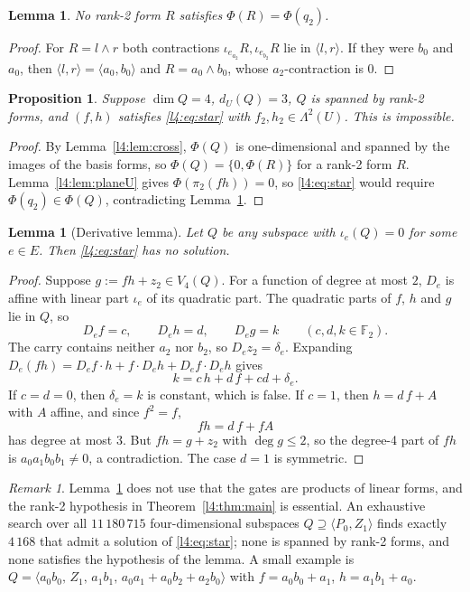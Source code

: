 \documentclass[11pt,a4paper]{article}
\theoremstyle{plain}
\newtheorem{lemma}[theorem]{Lemma}
\newtheorem{proposition}[theorem]{Proposition}
\theoremstyle{remark}
\newtheorem{remark}[theorem]{Remark}
\newcommand{\F}{\mathbb F_2}
\newcommand{\Lam}{\Lambda^2}
\newcommand{\dU}{d_U}
\newcommand{\Dir}{E}
\begin{document}
\begin{lemma}\label{l4:lem:noq2}
No rank-2 form $R$ satisfies $\Phi(R)=\Phi(q_2)$.
\end{lemma}

\begin{proof}
For $R=l\wedge r$ both contractions $\iota_{e_{a_2}}R,\iota_{e_{b_2}}R$ lie in $\langle l,r\rangle$. If they were $b_0$ and $a_0$, then $\langle l,r\rangle=\langle a_0,b_0\rangle$ and $R=a_0\wedge b_0$, whose $a_2$-contraction is $0$.
\end{proof}

\begin{proposition}\label{l4:prop:B}
Suppose $\dim Q=4$, $\dU(Q)=3$, $Q$ is spanned by rank-2 forms, and $(f,h)$ satisfies \eqref{l4:eq:star} with $f_2,h_2\in\Lam(U)$. This is impossible.
\end{proposition}

\begin{proof}
By Lemma~\ref{l4:lem:cross}, $\Phi(Q)$ is one-dimensional and spanned by the images of the basis forms, so $\Phi(Q)=\{0,\Phi(R)\}$ for a rank-2 form $R$. Lemma~\ref{l4:lem:planeU} gives $\Phi(\pi_2(fh))=0$, so \eqref{l4:eq:star} would require $\Phi(q_2)\in\Phi(Q)$, contradicting Lemma~\ref{l4:lem:noq2}.
\end{proof}

\begin{lemma}[Derivative lemma]\label{l4:lem:deriv}
Let $Q$ be any subspace with $\iota_e(Q)=0$ for some $e\in\Dir$. Then \eqref{l4:eq:star} has no solution.
\end{lemma}

\begin{proof}
Suppose $g:=fh+z_2\in V_4(Q)$. For a function of degree at most $2$, $D_e$ is affine with linear part $\iota_e$ of its quadratic part. The quadratic parts of $f$, $h$ and $g$ lie in $Q$, so
\[
  D_ef=c,\qquad D_eh=d,\qquad D_eg=k\qquad(c,d,k\in\F).
\]
The carry contains neither $a_2$ nor $b_2$, so $D_ez_2=\delta_e$. Expanding $D_e(fh)=D_ef\cdot h+f\cdot D_eh+D_ef\cdot D_eh$ gives
\[
  k=c\,h+d\,f+cd+\delta_e .
\]
If $c=d=0$, then $\delta_e=k$ is constant, which is false. If $c=1$, then $h=d\,f+A$ with $A$ affine, and since $f^2=f$,
\[
  fh=d\,f+f A
\]
has degree at most $3$. But $fh=g+z_2$ with $\deg g\le2$, so the degree-4 part of $fh$ is $a_0a_1b_0b_1\neq0$, a contradiction. The case $d=1$ is symmetric.
\end{proof}
\begin{remark}\label{l4:rem:rank2essential}
Lemma~\ref{l4:lem:deriv} does not use that the gates are products of linear forms, and the rank-2 hypothesis in Theorem~\ref{l4:thm:main} is essential. An exhaustive search over all $11\,180\,715$ four-dimensional subspaces $Q\supseteq\langle P_0,Z_1\rangle$ finds exactly $4\,168$ that admit a solution of \eqref{l4:eq:star}; none is spanned by rank-2 forms, and none satisfies the hypothesis of the lemma. A small example is $Q=\langle a_0b_0,\,Z_1,\,a_1b_1,\,a_0a_1+a_0b_2+a_2b_0\rangle$ with $f=a_0b_0+a_1$, $h=a_1b_1+a_0$.
\end{remark}
\end{document}
